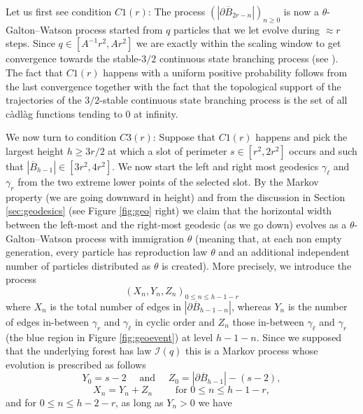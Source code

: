 \documentclass[AHL,XML,longabstracts,Unicode,NoSaveZebib]{cedram}
\begin{document}
Let us first see condition $C1(r)$: The process $(| \partial \overline{B}_{2r-n}|)_{n \geq 0}$ is now a $\theta$-Galton--Watson process started from $q$ particles that we let evolve during $ \approx r$ steps. Since $ q \in [A^{-1}r^2,Ar^2]$ we are exactly within the scaling window to get convergence towards the stable-$3/2$ continuous state branching process (see \cite{DLG02}). The fact that $C1(r)$ happens with a uniform positive probability follows from the last convergence  together with the fact that the topological support of the trajectories of  the $3/2$-stable continuous state branching process is the set of all c\`adl\`ag functions tending to $0$ at infinity.

We now turn to condition $C3(r)$: Suppose that $C1(r)$ happens and pick the largest height  $h \geq 3r/2$ at which  a slot of perimeter $s \in [r^2,2r^2]$ occurs and such that $|\overline{B}_{h-1}| \in  [3r^{2}, 4r^{2}]$. We now start the left and right most geodesics $\gamma_{ \ell}$ and $\gamma_{r}$ from the two extreme lower points of the selected slot. By the Markov property (we are going downward in height) and from the discussion in Section \ref{sec:geodesics} (see Figure \ref{fig:geo} right) we claim that the horizontal width between the left-most and the right-most geodesic (as we go down) evolves as a $\theta$-Galton--Watson process with immigration $\theta$ {(meaning that, at each non empty generation, every particle has reproduction law $\theta$ and an additional independent number of particles distributed as $\theta$ is created)}. More precisely, we introduce the process $$(X_{n}, Y_{n}, Z_{n})_{0 \leq n \leq h-1-r}$$ where $X_{n}$ is the total number of edges in $| \partial \overline{B}_{h-1-n}|$, whereas $Y_{n}$ is the number of edges in-between $\gamma_{r}$ and $\gamma_{\ell}$ in cyclic order and $Z_{n}$ those in-between $\gamma_{\ell}$ and $\gamma_{r}$ (the blue region in Figure \ref{fig:geoevent}) at level $h-1-n$.  Since we supposed that the underlying forest has law $ \mathcal{I}(q)$ this is a Markov process whose evolution is prescribed as follows
$$ Y_{0} = s-2 \quad \mbox{ and } \quad  Z_{0} = | \partial \overline{B}_{h-1}|-(s-2),$$
$$
X_{n}=Y_{n}+Z_{n} \qquad \mbox{ for } 0 \leq n \leq h-1-r,$$
and for $0 \leq n \leq h-2-r$, as long as $Y_{n}>0$ we have
\end{document}
